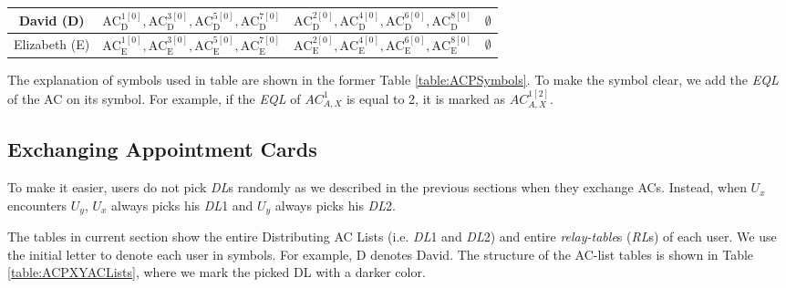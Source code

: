 \begin{table} [hbtp]
\begin{tabu}{|c|l|l|l|}
David (D) & ${\mathrm{AC}}^{\mathrm{1}\left[0\right]}_{\mathrm{D}},{\mathrm{AC}}^{\mathrm{3}\left[0\right]}_{\mathrm{D}},{\mathrm{AC}}^{\mathrm{5}\left[0\right]}_{\mathrm{D}},{\mathrm{AC}}^{\mathrm{7}\left[0\right]}_{\mathrm{D}}$ & ${\mathrm{AC}}^{\mathrm{2}\left[0\right]}_{\mathrm{D}},{\mathrm{AC}}^{\mathrm{4}\left[0\right]}_{\mathrm{D}},{\mathrm{AC}}^{\mathrm{6}\left[0\right]}_{\mathrm{D}},{\mathrm{AC}}^{\mathrm{8}\left[0\right]}_{\mathrm{D}}$ & $\mathrm{\emptyset }$ \\ \hline 
Elizabeth (E) & ${\mathrm{AC}}^{\mathrm{1}\left[0\right]}_{\mathrm{E}},{\mathrm{AC}}^{\mathrm{3}\left[0\right]}_{\mathrm{E}},{\mathrm{AC}}^{\mathrm{5}\left[0\right]}_{\mathrm{E}},{\mathrm{AC}}^{\mathrm{7}\left[0\right]}_{\mathrm{E}}$ & ${\mathrm{AC}}^{\mathrm{2}\left[0\right]}_{\mathrm{E}},{\mathrm{AC}}^{\mathrm{4}\left[0\right]}_{\mathrm{E}},{\mathrm{AC}}^{\mathrm{6}\left[0\right]}_{\mathrm{E}},{\mathrm{AC}}^{\mathrm{8}\left[0\right]}_{\mathrm{E}}$ & $\mathrm{\emptyset }$ \\ \hline 
\end{tabu}
\end{table}

The explanation of symbols used in table are shown in the former Table \ref{table:ACPSymbols}. To make the symbol clear, we add the \textit{EQL} of the AC on its symbol. For example, if the \textit{EQL} of ${AC}^1_{A,X}$ is equal to 2, it is marked as ${AC}^{1\left[2\right]}_{A,X}$.


\subsection{ Exchanging Appointment Cards}

\noindent To make it easier, users do not pick \textit{DL}s randomly as we described in the previous sections when they exchange ACs. Instead, when $U_x$ encounters $U_y$, $U_x$ always picks his \textit{DL}1 and $U_y$ always picks his \textit{DL}2. 

The tables in current section show the entire Distributing AC Lists (i.e. \textit{DL}1 and \textit{DL}2) and entire \textit{relay-table}s (\textit{RL}s) of each user. We use the initial letter to denote each user in symbols. For example, D denotes David. The structure of the AC-list tables is shown in Table \ref{table:ACPXYACLists}, where we mark the picked DL with a darker color.

